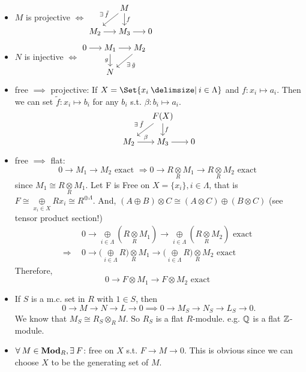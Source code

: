 \begin{fact} \mbox{}
  \begin{itemize}
    \item $M$ is projective $\iff$
      $\begin{tikzcd}[cramped, sep=15pt]
         & M \ar[dl, "\exists \tilde f"'] \ar[d, "f"] \\
        M_2 \ar[r] & M_3 \ar[r] & 0
      \end{tikzcd}$
    \item $N$ is injective $\iff$
      $\begin{tikzcd}[cramped, sep=15pt]
        0 \ar[r] & M_1 \ar[d, "g"'] \ar[r] & M_2 \ar[dl, "\exists \tilde g"] \\
         & N
      \end{tikzcd}$
    \item free $\implies$ projective:
      If $X = \Set{ x_i \given i \in \Lambda}$ and $f: x_i \mapsto a_i$. Then
      we can set $\tilde f: x_i \mapsto b_i$ for any $b_i$ s.t.
      $\beta: b_i \mapsto a_i$.
      \[\begin{tikzcd}[cramped, sep=15pt]
        & F(X) \ar[dl, "\exists \tilde f"'] \ar[d, "f"] \\
        M_2 \ar[r, "\beta"] & M_3 \ar[r] & 0
      \end{tikzcd}\]
    \item free $\implies$ flat:
      $$
        0 \to M_1 \to M_2 \text{ exact } \Rightarrow  0 \to R 
        \underset{R}{\otimes} M_1 \to R \underset{R}{\otimes} M_2 
        \text{ exact } 
      $$
      since $M_1 \cong R \underset{R}{\otimes} M_1$. Let F is Free 
      on $ X =\{x_i\}, i \in \Lambda$, that is $ F \cong 
      \underset{x_i \in X}{\oplus} Rx_i \cong R^{\oplus \Lambda}$.
      And, $(A \oplus B) \otimes C \cong (A\otimes C) \oplus 
      (B \otimes C)$ (see tensor product section!)
      $$
        \begin{aligned}
        & 0 \to  \underset{i \in \Lambda}{\oplus} (R \underset{R}{\otimes}
        M_1) \to \underset{i \in \Lambda}{\oplus} (R \underset{R}{\otimes}
        M_2) \text{ exact } \\
        \Rightarrow \ \ 
        & 0 \to \big( \underset{i \in \Lambda}{\oplus} R \big) 
        \underset{R}{\otimes} M_1 \to \big( 
        \underset{i \in \Lambda}{\oplus} R \big) 
        \underset{R}{\otimes} M_2
        \text{ exact }
        \end{aligned}
      $$
      Therefore, 
      $$
      0 \to F \otimes M_1 \to F \otimes M_2 \text{ exact } 
      $$
    \item If $S$ is a m.c. set in $R$ with $1 \in S$, then
      \[ 0 \to M \to N \to L \to 0 \implies 0 \to M_S \to N_S \to L_S \to 0. \]
      We know that $M_S \cong R_S \otimes_R M$. So $R_S$ is a flat $R$-module.
      e.g. $\mathbb{Q}$ is a flat $\mathbb{Z}$-module.
    \item $\forall M \in \Mod_R, \exists F$: free on $X$ s.t. $F \to M \to 0$.
      This is obvious since we can choose $X$ to be the generating set of $M$.
  \end{itemize}
\end{fact}

